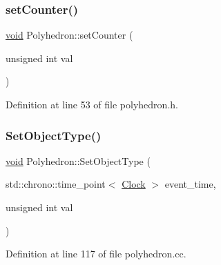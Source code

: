 \subsubsection{\texorpdfstring{set\+Counter()}{setCounter()}}
{\footnotesize\ttfamily \mbox{\hyperlink{glad_8h_a950fc91edb4504f62f1c577bf4727c29}{void}} Polyhedron\+::set\+Counter (\begin{DoxyParamCaption}\item[{unsigned int}]{val }\end{DoxyParamCaption})\hspace{0.3cm}{\ttfamily [inline]}}



Definition at line 53 of file polyhedron.\+h.

\mbox{\label{class_polyhedron_a014c8f981aef5fa1d70dcb5be6a0875a}} 
\subsubsection{\texorpdfstring{Set\+Object\+Type()}{SetObjectType()}}
{\footnotesize\ttfamily \mbox{\hyperlink{glad_8h_a950fc91edb4504f62f1c577bf4727c29}{void}} Polyhedron\+::\+Set\+Object\+Type (\begin{DoxyParamCaption}\item[{std\+::chrono\+::time\+\_\+point$<$ \mbox{\hyperlink{universe_8h_a0ef8d951d1ca5ab3cfaf7ab4c7a6fd80}{Clock}} $>$}]{event\+\_\+time,  }\item[{unsigned int}]{val }\end{DoxyParamCaption})}



Definition at line 117 of file polyhedron.\+cc.

